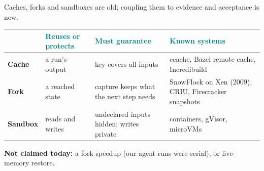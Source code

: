 \begin{frame}[t]{\ev{\tagO}Caches, forks and sandboxes are old; coupling them to evidence and acceptance is new.}
\vspace{0pt}
{\fontsize{11}{13.2}\selectfont\renewcommand{\arraystretch}{1.0}
\begin{tabularx}{\linewidth}{@{}L{1.75cm}L{3.3cm}L{3.6cm}Y@{}}
\toprule
 & \textcolor{Teal}{\textbf{Reuses or protects}} & \textcolor{Teal}{\textbf{Must guarantee}} & \textcolor{Teal}{\textbf{Known systems}}\\
\midrule
\textbf{Cache} & a run's output & key covers all inputs & \textcolor{Muted}{ccache, Bazel remote cache, Incredibuild}\\\addlinespace[3pt]
\textbf{Fork} & a reached state & capture keeps what the next step needs & \textcolor{Muted}{SnowFlock on Xen (2009), CRIU, Firecracker snapshots}\\\addlinespace[3pt]
\textbf{Sandbox} & reads and writes & undeclared inputs hidden; writes private & \textcolor{Muted}{containers, gVisor, microVMs}\\
\bottomrule
\end{tabularx}\par}
\vspace{.12cm}
{\fontsize{10.5}{12.8}\selectfont\color{Muted}\textbf{Not claimed today:} a fork speedup (our agent runs were serial), or live-memory restore.\par}

\end{frame}
